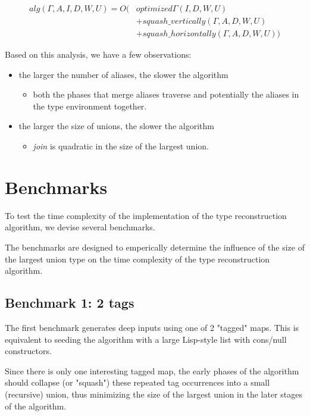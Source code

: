 \begin{align*}
alg(\Gamma,A,I,D,W,U) = O(&optimized\Gamma(I, D, W, U) \\
												  &+ squash\_vertically(\Gamma, A, D, W, U)\\
													&+ squash\_horizontally(\Gamma, A, D, W, U))
\end{align*}

Based on this analysis, we have a few observations:

\begin{itemize}
\item the larger the number of aliases, the slower the algorithm
	\begin{itemize}
		\item both the phases that merge aliases traverse and potentially
					the aliases in the type environment together.
	\end{itemize}
\item the larger the size of unions, the slower the algorithm
	\begin{itemize}
		\item \emph{join} is quadratic in the size of the largest union.
	\end{itemize}
\end{itemize}

\section{Benchmarks}

To test the time complexity of the implementation of the type reconstruction
algorithm, we devise several benchmarks.

The benchmarks are designed to emperically determine the influence of the
size of the largest union type on the time complexity of the type reconstruction
algorithm.

\subsection{Benchmark 1: 2 tags}

The first benchmark generates deep inputs using one of 2 "tagged" maps.
This is equivalent to seeding the algorithm with
a large Lisp-style list with cons/null constructors.

Since there is only one interesting tagged map, the early phases of the
algorithm should collapse (or "squash") these repeated tag occurrences
into a small (recursive) union, thus minimizing the size of the largest
union in the later stages of the algorithm.


